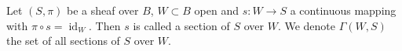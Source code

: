 Let $(S, \pi)$ be a sheaf over $B$, $W \subset B$ open and $s: W \to S$ a continuous mapping with $\pi \circ s = \operatorname{id}_W$. Then $s$ is called a section of $S$ over $W$. We denote $\Gamma(W, S)$ the set of all sections of $S$ over $W$.
